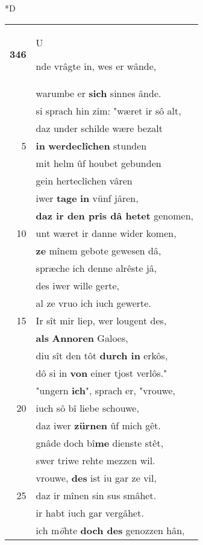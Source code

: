\documentclass[8pt,a4paper,notitlepage]{article}
\begin{document}
\begin{table}[ht]
\begin{minipage}[t]{0.5\linewidth}
\small
\begin{center}*D
\end{center}
\begin{tabular}{rl}
\textbf{346} & \begin{large}U\end{large}nde vrâgte in, wes er wânde,\\ 
 & warumbe er \textbf{sich} sinnes ânde.\\ 
 & si sprach hin zim: "wæret ir sô alt,\\ 
 & daz under schilde wære bezalt\\ 
5 & \textbf{in} \textbf{werdeclîchen} stunden\\ 
 & mit helm ûf houbet gebunden\\ 
 & gein herteclîchen vâren\\ 
 & iwer \textbf{tage} \textbf{in} vünf jâren,\\ 
 & \textbf{daz ir den prîs dâ hetet} genomen,\\ 
10 & unt wæret ir danne wider komen,\\ 
 & \textbf{ze} mînem gebote gewesen dâ,\\ 
 & spræche ich denne alrêste jâ,\\ 
 & des iwer wille gerte,\\ 
 & al ze vruo ich iuch gewerte.\\ 
15 & Ir sît mir liep, wer lougent des,\\ 
 & \textbf{als} \textbf{Annoren} Galoes,\\ 
 & diu sît den tôt \textbf{durch in} erkôs,\\ 
 & dô si in \textbf{von} einer tjost verlôs."\\ 
 & "ungern \textbf{ich}", sprach er, "vrouwe,\\ 
20 & iuch sô bî liebe schouwe,\\ 
 & daz iwer \textbf{zürnen} ûf mich gêt.\\ 
 & gnâde doch bî\textbf{me} dienste stêt,\\ 
 & swer triwe rehte mezzen wil.\\ 
 & vrouwe, \textbf{des} ist iu gar ze vil,\\ 
25 & daz ir mînen sin sus smâhet.\\ 
 & ir habt iuch gar vergâhet.\\ 
 & ich m\textit{ö}hte \textbf{doch des} genozzen hân,\\ 

\end{tabular}
\end{minipage}
\end{table}
\end{document}
